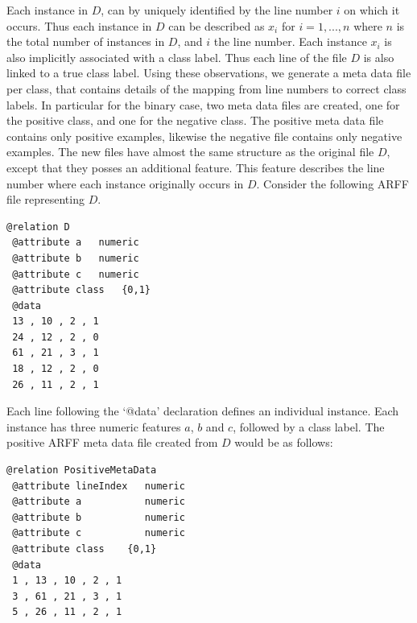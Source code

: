 \documentclass[twoside,a4paper]{refart}
\begin{document}
Each instance in $D$, can by uniquely identified by the line number $i$ on which it occurs. Thus each instance in $D$ can be described as $x_{i}$ for $i=1,...,n$ where $n$ is the total number of instances in $D$, and $i$ the line number. Each instance $x_{i}$ is also implicitly associated with a class label. Thus each line of the file $D$ is also linked to a true class label. Using these observations, we generate a meta data file per class, that contains details of the mapping from line numbers to correct class labels. In particular for the binary case, two meta data files are created, one for the positive class, and one for the negative class. The positive meta data file contains only positive examples, likewise the negative file contains only negative examples. The new files have almost the same structure as the original file $D$, except that they posses an additional feature. This feature describes the line number where each instance originally occurs in $D$. Consider the following ARFF file representing $D$.
\begin{lstlisting}[caption=The original ARFF data set file $D$.,label=listing5]
 @relation D
 @attribute a	numeric
 @attribute b	numeric
 @attribute c	numeric
 @attribute class	{0,1}
 @data
 13 , 10 , 2 , 1
 24 , 12 , 2 , 0
 61 , 21 , 3 , 1
 18 , 12 , 2 , 0
 26 , 11 , 2 , 1
\end{lstlisting}
Each line following the `@data' declaration defines an individual instance. Each instance has three numeric features $a$, $b$ and $c$, followed by a class label. The positive ARFF meta data file created from $D$ would be as follows:
\begin{lstlisting}[caption=The positive ARFF meta data file.,label=listing6]
 @relation PositiveMetaData
 @attribute lineIndex	numeric
 @attribute a		 	numeric
 @attribute b		 	numeric
 @attribute c		 	numeric
 @attribute class	 {0,1}
 @data
 1 , 13 , 10 , 2 , 1
 3 , 61 , 21 , 3 , 1
 5 , 26 , 11 , 2 , 1
\end{lstlisting}
\end{document}
